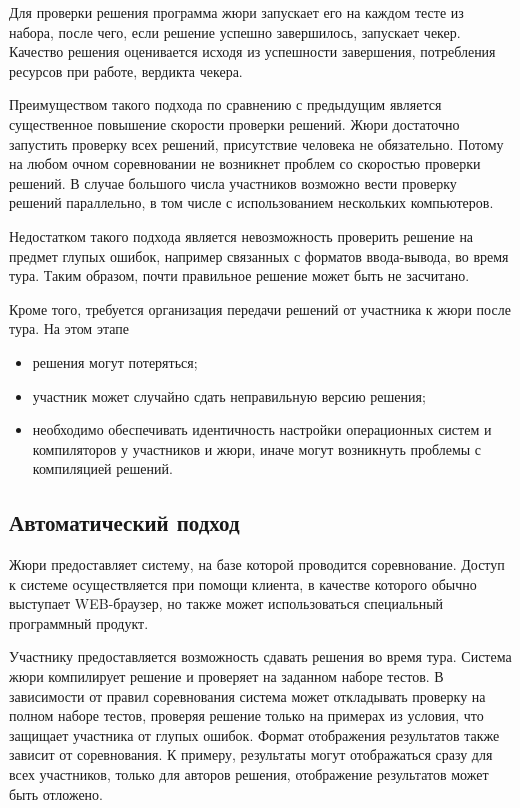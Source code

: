 Для проверки решения программа жюри запускает его на каждом тесте
из набора, после чего, если решение успешно завершилось, запускает чекер.
Качество решения оценивается исходя из успешности завершения, потребления ресурсов при работе,
вердикта чекера.

Преимуществом такого подхода по сравнению с предыдущим является существенное повышение скорости
проверки решений. Жюри достаточно запустить проверку всех решений,
присутствие человека не обязательно. Потому на любом очном соревновании не возникнет
проблем со скоростью проверки решений. В случае большого числа участников возможно вести проверку
решений параллельно, в том числе с использованием нескольких компьютеров.

Недостатком такого подхода является невозможность проверить решение на предмет глупых ошибок,
например связанных с форматов ввода-вывода, во время тура. Таким образом,
почти правильное решение может быть не засчитано.

Кроме того, требуется организация передачи решений от участника к жюри после тура.
На этом этапе
\begin{itemize}
	\item решения могут потеряться;
	\item участник может случайно сдать неправильную версию решения;
	\item необходимо обеспечивать идентичность настройки операционных систем и компиляторов
		у участников и жюри, иначе могут возникнуть проблемы с компиляцией решений.
\end{itemize}

\subsection{Автоматический подход}
Жюри предоставляет систему, на базе которой проводится соревнование.
Доступ к системе осуществляется при помощи клиента, в качестве которого
обычно выступает WEB-браузер, но также может использоваться специальный программный продукт.

Участнику предоставляется возможность сдавать решения во время тура. Система жюри
компилирует решение и проверяет на заданном наборе тестов.
В зависимости от правил соревнования система может откладывать проверку на полном наборе тестов,
проверяя решение только на примерах из условия, что защищает участника от глупых ошибок.
Формат отображения результатов также зависит от соревнования. К примеру, результаты
могут отображаться сразу для всех участников, только для авторов решения, отображение результатов
может быть отложено.

